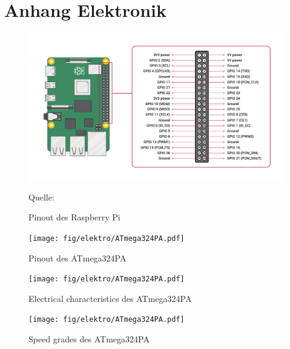 \renewcommand\appendixname{Anhang}
\renewcommand\appendixpagename{Anhang}
\renewcommand\appendixtocname{Anhang}

\lohead{}

\appendix
\begingroup
\makeatletter
\let\ps@plain\ps@empty
\appendixpage
\makeatother
\endgroup

\chapter{Anhang Elektronik}

\begin{figure}[htb]
    \includegraphics[scale=0.25]{fig/elektro/GPIO-Pinout-Diagram.png}
    {\par\raggedleft\footnotesize \tiny Quelle: }
    \caption{Pinout des Raspberry Pi}
\end{figure}

\begin{figure}[hb]
    \centering
    \texttt{[image: fig/elektro/ATmega324PA.pdf]}
    \caption{Pinout des ATmega324PA}
\end{figure}

\begin{figure}[hb]
    \centering
    \texttt{[image: fig/elektro/ATmega324PA.pdf]}
    \caption{Electrical characteristics des ATmega324PA}
\end{figure}

\begin{figure}[hb]
    \centering
    \texttt{[image: fig/elektro/ATmega324PA.pdf]}
    \caption{Speed grades des ATmega324PA}
\end{figure}

